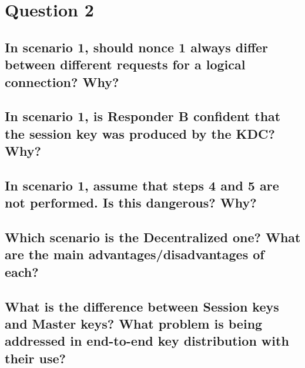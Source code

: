 \documentclass{report}
\begin{document}
	\section{Question 2}
	\startsection
		\renewcommand{\thesubsection}{\thesection.\Alph{subsection}}
		\subsection{In scenario 1, should nonce 1 always differ between different requests for a logical connection? Why?}
		\startsubsection
		\closesection
		\subsection{In scenario 1, is Responder B confident that the session key was produced by the KDC? Why?}
		\startsubsection
		\closesection
		\subsection{In scenario 1, assume that steps 4 and 5 are not performed. Is this dangerous? Why?}
		\startsubsection
		\closesection
		\subsection{Which scenario is the Decentralized one? What are the main advantages/disadvantages of each?}
		\startsubsection
		\closesection
		\subsection{What is the difference between Session keys and Master keys? What problem is being addressed in end-to-end key distribution with their use?}
		\startsubsection
		\closesection
	\closesection
\end{document}
